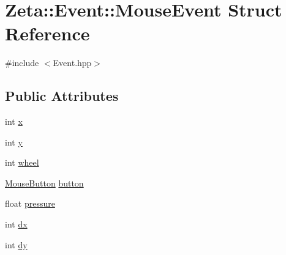 \hypertarget{structZeta_1_1Event_1_1MouseEvent}{\section{Zeta\+:\+:Event\+:\+:Mouse\+Event Struct Reference}
\label{structZeta_1_1Event_1_1MouseEvent}
}


{\ttfamily \#include $<$Event.\+hpp$>$}

\subsection*{Public Attributes}
\begin{DoxyCompactItemize}
\item 
int \hyperlink{structZeta_1_1Event_1_1MouseEvent_a2a2d85d1de763cb6aae7663e4612bd25}{x}
\item 
int \hyperlink{structZeta_1_1Event_1_1MouseEvent_ac156879c22a05daa1bdb1a60f8ca5f63}{y}
\item 
int \hyperlink{structZeta_1_1Event_1_1MouseEvent_a5bb942a148c877e42736eb54f4f338c8}{wheel}
\item 
\hyperlink{namespaceZeta_ad0d73128c6ba1daad12e3e286d63c7d3}{Mouse\+Button} \hyperlink{structZeta_1_1Event_1_1MouseEvent_a7dce83438e062fe49bf7d7bd8e883298}{button}
\item 
float \hyperlink{structZeta_1_1Event_1_1MouseEvent_a6c7e16cd4ef1eaf2a1a7243dd9296b64}{pressure}
\item 
int \hyperlink{structZeta_1_1Event_1_1MouseEvent_a15c1baccd49cbd74ac9a4d6bc5275dc3}{dx}
\item 
int \hyperlink{structZeta_1_1Event_1_1MouseEvent_a834c2f8cb2ec702823f1a2cb961c9dd7}{dy}
\end{DoxyCompactItemize}


